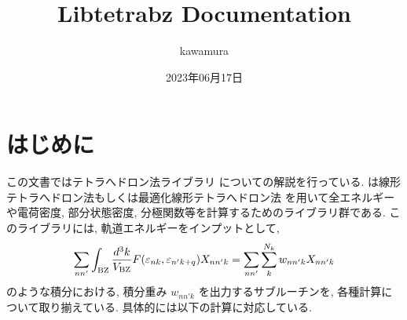 \documentclass[letterpaper,10pt,dvipdfmx,openany]{sphinxmanual}
\title{Libtetrabz Documentation}
\date{2023年06月17日}
\author{kawamura}
\begin{document}
\pagestyle{empty}
\sphinxmaketitle
\pagestyle{plain}
\sphinxtableofcontents
\pagestyle{normal}
\label{\detokenize{index::doc}}


\sphinxstepscope


\chapter{はじめに}
\label{\detokenize{overview:id1}}\label{\detokenize{overview::doc}}
\sphinxAtStartPar
この文書ではテトラへドロン法ライブラリ  についての解説を行っている.
 は線形テトラへドロン法もしくは最適化線形テトラへドロン法 {\hyperref[\detokenize{ref:ref}]{}}
を用いて全エネルギーや電荷密度, 部分状態密度,
分極関数等を計算するためのライブラリ群である.
このライブラリには, 軌道エネルギーをインプットとして,
\begin{equation*}
\begin{split}\begin{align}
\sum_{n n'} \int_{\rm BZ} \frac{d^3 k}{V_{\rm BZ}} F(\varepsilon_{n k}, \varepsilon_{n' k+q})X_{n n' k}
= \sum_{n n'} \sum_{k}^{N_k} w_{n n' k} X_{n n' k}
\end{align}\end{split}
\end{equation*}
\sphinxAtStartPar
のような積分における, 積分重み \(w_{n n' k}\) を出力するサブルーチンを,
各種計算について取り揃えている. 具体的には以下の計算に対応している.
\end{document}
